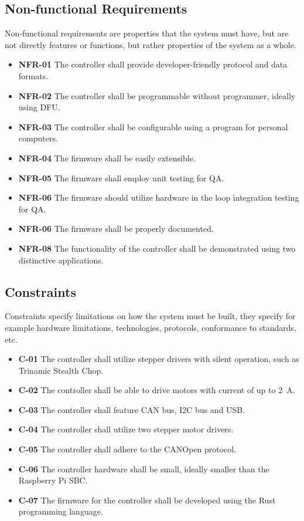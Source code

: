 \subsection{Non-functional Requirements}
\label{subsec:nonfunc_req}
Non-functional requirements are properties that the system must have, but are not directly features or functions, but rather properties of the system as a whole.

\begin{itemize}
    \item \textbf{NFR-01} The controller shall provide developer-friendly protocol and data formats.
    \item \textbf{NFR-02} The controller shall be programmable without programmer, ideally using DFU.
    \item \textbf{NFR-03} The controller shall be configurable using a program for personal computers.
    \item \textbf{NFR-04} The firmware shall be easily extensible.
    \item \textbf{NFR-05} The firmware shall employ unit testing for QA.
    \item \textbf{NFR-06} The firmware should utilize hardware in the loop integration testing for QA.
    \item \textbf{NFR-06} The firmware shall be properly documented.
    \item \textbf{NFR-08} The functionality of the controller shall be demonstrated using two distinctive applications.
\end{itemize}

\subsection{Constraints}
\label{subsec:constraints}
Constraints specify limitations on how the system must be built, they specify for example hardware limitations, technologies, protocols, conformance to standards, etc.

\begin{itemize}
    \item \textbf{C-01} The controller shall utilize stepper drivers with silent operation, such as Trinamic Stealth Chop.
    \item \textbf{C-02} The controller shall be able to drive motors with current of up to 2~A.
    \item \textbf{C-03} The controller shall feature CAN bus, I2C bus and USB.
    \item \textbf{C-04} The controller shall utilize two stepper motor drivers.
    \item \textbf{C-05} The controller shall adhere to the CANOpen protocol.
    \item \textbf{C-06} The controller hardware shall be small, ideally smaller than the Raspberry Pi SBC.
    \item \textbf{C-07} The firmware for the controller shall be developed using the Rust programming language.
\end{itemize}